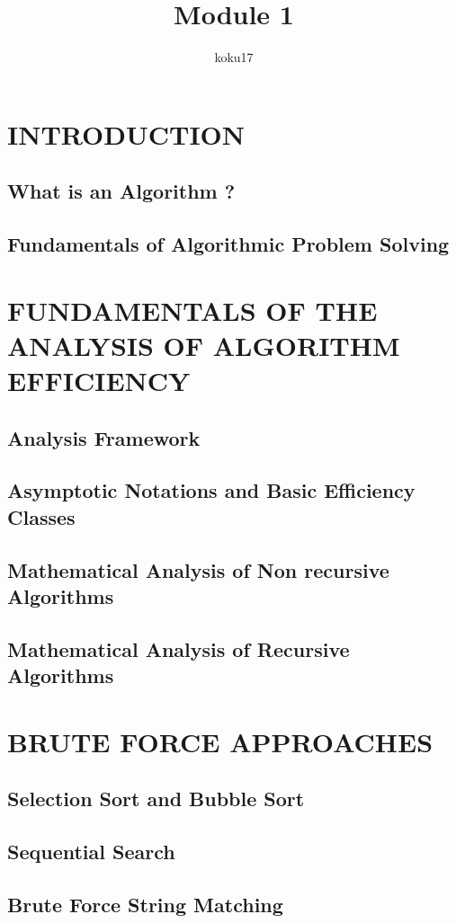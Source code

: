 \documentclass{article}
\author{koku17}
\title{Module 1}
\begin{document}
	\maketitle \thispagestyle{empty} \newpage
	\tableofcontents \thispagestyle{empty} \newpage \setcounter{page}{1}
	\section{INTRODUCTION}
	\subsection{What is an Algorithm ?}
	\subsection{Fundamentals of Algorithmic Problem Solving}

	\section{FUNDAMENTALS OF THE ANALYSIS OF ALGORITHM EFFICIENCY}
	\subsection{Analysis Framework}
	\subsection{Asymptotic Notations and Basic Efficiency Classes}
	\subsection{Mathematical Analysis of Non recursive Algorithms}
	\subsection{Mathematical Analysis of Recursive Algorithms}

	\section{BRUTE FORCE APPROACHES}
	\subsection{Selection Sort and Bubble Sort}
	\subsection{Sequential Search}
	\subsection{Brute Force String Matching}
\end{document}
